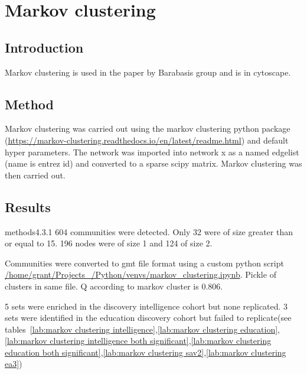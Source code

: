 \section{Markov clustering}
\label{sec:markov clustering}

\subsection{Introduction}

Markov clustering is used in the paper by Barabasis group \cite{ghiassian2015disease} and is in cytoscape. 
\subsection{Method}
Markov clustering was carried out using the markov clustering python package (\url{https://markov-clustering.readthedocs.io/en/latest/readme.html}) and default hyper parameters. The network was imported into network x as a named edgelist (name is entrez id) and converted to a sparse scipy matrix. Markov clustering was then carried out.

\subsection{Results}
methods4.3.1 
604 communities were detected. Only 32 were of size greater than or equal to 15.
196 nodes were of size 1 and 124 of size 2.

Communities were converted to gmt file format using a custom python script \url{/home/grant/Projects_/Python/venvs/markov_clustering.ipynb}. Pickle of clusters in same file. Q according to markov cluster is 0.806.

5 sets were enriched in the discovery intelligence cohort but none replicated. 3 sets were identified in the education discovery cohort but failed to replicate(see tables~\ref{lab:markov clustering intelligence},\ref{lab:markov clustering education},\ref{lab:markov clustering intelligence both significant},\ref{lab:markov clustering education both significant},\ref{lab:markov clustering sav2},\ref{lab:markov clustering ea3})

